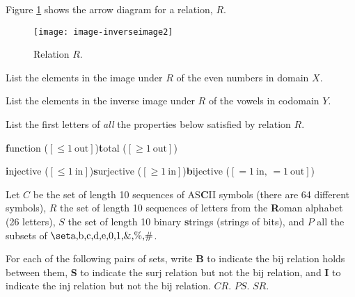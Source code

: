 \documentclass[handout]{mcs}
\begin{document}


\begin{problem}
Figure \ref{fig:img} shows the arrow diagram for a relation, $R$.

\begin{figure}[h]

\texttt{[image: image-inverseimage2]}

\caption{Relation $R$.}
\label{fig:img}
\end{figure}
\bparts

\ppart List the elements in the image under $R$ of the even numbers in domain $X$.\hfill\brule{1.5in}

\ppart List the elements in the inverse image under $R$ of the vowels in codomain $Y$.\hfill\brule{1.5in}

\ppart List the first letters of \emph{all} the properties below
satisfied by relation $R$.\hfill\brule{1.0in}
\begin{center}
 \textbf{f}unction ($[\le 1\ \text{out}]$)\qquad \textbf{t}otal ($[\ge
   1\ \text{out}]$)

 \textbf{i}njective ($[\le 1\ \text{in}]$)\qquad \textbf{s}urjective
 ($[\ge 1\ \text{in}]$)\qquad \textbf{b}ijective ($[= 1\ \text{in, } =
   1\ \text{out}]$)
\end{center}

\eparts
\end{problem}

\begin{problem}
Let $C$ be the set of length 10 sequences of AS\textbf{C}II symbols
(there are 64 different symbols), $R$ the set of length 10 sequences
of letters from the \textbf{R}oman alphabet (26 letters), $S$ the
set of length 10 binary \textbf{s}trings (strings of bits), and $P$
all the subsets of $\set{\text{a,b,c,d,e,0,1,\&,\%,\#}}$.

For each of the following pairs of sets, write \textbf{B} to
indicate the bij relation holds between them, \textbf{S} to indicate
the surj relation but not the bij relation, and \textbf{I} to indicate
the inj relation but not the bij relation.
\bparts
\ppart $C$\brule{0.3in}$R$.
\ppart $P$\brule{0.3in}$S$.
\ppart $S$\brule{0.3in}$R$.
\eparts
\end{problem}

\end{document}
